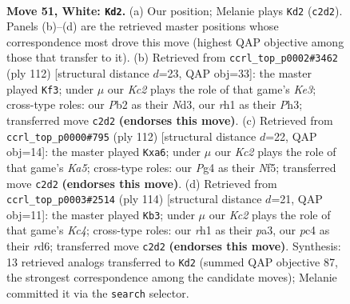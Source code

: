 \documentclass[11pt]{article}
\begin{document}
\clearpage

\begin{figure}[p]\centering
\begin{subfigure}{0.46\textwidth}\centering
\resizebox{\linewidth}{!}{%
\newchessgame
\chessboard[
  setfen={8/R7/5nk1/1P1P4/p1p3P1/8/1PK5/7r w - - 13 51},
  showmover=false,
  pgfstyle=straightmove, color=movearrow, markmove={c2-d2}
]}
\caption{}
\end{subfigure}\hfill
\begin{subfigure}{0.46\textwidth}\centering
\resizebox{\linewidth}{!}{%
\newchessgame
\chessboard[
  setfen={8/8/5nk1/1R4p1/r5P1/3NK2P/8/8 w - - 23 57},
  showmover=false,
  pgfstyle=straightmove, color=movearrow, markmove={e3-f3}
]}
\caption{}
\end{subfigure}
\\[4pt]
\begin{subfigure}{0.46\textwidth}\centering
\resizebox{\linewidth}{!}{%
\newchessgame
\chessboard[
  setfen={8/1r6/p3n3/K2k1NPp/8/7P/8/2R5 w - - 1 57},
  showmover=false,
  pgfstyle=straightmove, color=movearrow, markmove={a5-a6}
]}
\caption{}
\end{subfigure}\hfill
\begin{subfigure}{0.46\textwidth}\centering
\resizebox{\linewidth}{!}{%
\newchessgame
\chessboard[
  setfen={7R/1kn1P3/3r4/8/2K4p/p1P2P2/7P/8 w - - 2 58},
  showmover=false,
  pgfstyle=straightmove, color=movearrow, markmove={c4-b3}
]}
\caption{}
\end{subfigure}
\caption{\textbf{Move 51, White: \texttt{Kd2}.} (a) Our position; Melanie plays \texttt{Kd2} (\texttt{c2d2}). Panels (b)--(d) are the retrieved master positions whose correspondence most drove this move (highest QAP objective among those that transfer to it). (b) Retrieved from \texttt{ccrl\_top\_p0002\#3462} (ply 112) [structural distance $d$=23, QAP obj=33]: the master played \texttt{Kf3}; under $\mu$ our \emph{Kc2} plays the role of that game's \emph{Ke3}; cross-type roles: our \emph{P}b2 as their \emph{N}d3, our \emph{r}h1 as their \emph{P}h3; transferred move \texttt{c2d2} \textbf{(endorses this move)}. (c) Retrieved from \texttt{ccrl\_top\_p0000\#795} (ply 112) [structural distance $d$=22, QAP obj=14]: the master played \texttt{Kxa6}; under $\mu$ our \emph{Kc2} plays the role of that game's \emph{Ka5}; cross-type roles: our \emph{P}g4 as their \emph{N}f5; transferred move \texttt{c2d2} \textbf{(endorses this move)}. (d) Retrieved from \texttt{ccrl\_top\_p0003\#2514} (ply 114) [structural distance $d$=21, QAP obj=11]: the master played \texttt{Kb3}; under $\mu$ our \emph{Kc2} plays the role of that game's \emph{Kc4}; cross-type roles: our \emph{r}h1 as their \emph{p}a3, our \emph{p}c4 as their \emph{r}d6; transferred move \texttt{c2d2} \textbf{(endorses this move)}. Synthesis: 13 retrieved analogs transferred to \texttt{Kd2} (summed QAP objective 87, the strongest correspondence among the candidate moves); Melanie committed it via the \texttt{search} selector.}
\label{fig:thought-m100}
\end{figure}
\end{document}
